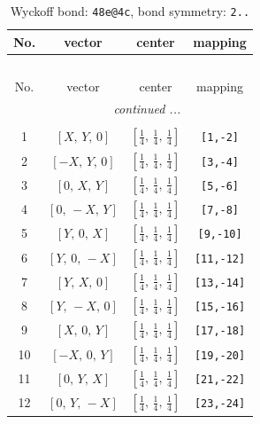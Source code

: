 \documentclass[fleqn,8pt]{jsarticle}
\begin{document}
\renewcommand{\arraystretch}{1.2}
\begin{longtable}{cccc}
\caption{Wyckoff bond: {\tt 48e@4c}, bond symmetry: {\tt 2..}}
 \\
 \hline \hline
No. & vector & center & mapping \\ \hline \endfirsthead

\multicolumn{3}{l}{\tablename\ \thetable{}} \\
 \hline \hline
No. & vector & center & mapping \\ \hline \endhead

 \hline \hline
\multicolumn{3}{r}{\footnotesize\it continued ...} \\ \endfoot

 \hline \hline
\multicolumn{3}{r}{} \\ \endlastfoot

1 & $\left[ X,\, Y,\, 0 \right]$ & $\left[ \frac{1}{4},\, \frac{1}{4},\, \frac{1}{4} \right]$ & {\tt [1,-2]} \\ \hline
2 & $\left[ - X,\, Y,\, 0 \right]$ & $\left[ \frac{1}{4},\, \frac{1}{4},\, \frac{1}{4} \right]$ & {\tt [3,-4]} \\ \hline
3 & $\left[ 0,\, X,\, Y \right]$ & $\left[ \frac{1}{4},\, \frac{1}{4},\, \frac{1}{4} \right]$ & {\tt [5,-6]} \\ \hline
4 & $\left[ 0,\, - X,\, Y \right]$ & $\left[ \frac{1}{4},\, \frac{1}{4},\, \frac{1}{4} \right]$ & {\tt [7,-8]} \\ \hline
5 & $\left[ Y,\, 0,\, X \right]$ & $\left[ \frac{1}{4},\, \frac{1}{4},\, \frac{1}{4} \right]$ & {\tt [9,-10]} \\ \hline
6 & $\left[ Y,\, 0,\, - X \right]$ & $\left[ \frac{1}{4},\, \frac{1}{4},\, \frac{1}{4} \right]$ & {\tt [11,-12]} \\ \hline
7 & $\left[ Y,\, X,\, 0 \right]$ & $\left[ \frac{1}{4},\, \frac{1}{4},\, \frac{1}{4} \right]$ & {\tt [13,-14]} \\ \hline
8 & $\left[ Y,\, - X,\, 0 \right]$ & $\left[ \frac{1}{4},\, \frac{1}{4},\, \frac{1}{4} \right]$ & {\tt [15,-16]} \\ \hline
9 & $\left[ X,\, 0,\, Y \right]$ & $\left[ \frac{1}{4},\, \frac{1}{4},\, \frac{1}{4} \right]$ & {\tt [17,-18]} \\ \hline
10 & $\left[ - X,\, 0,\, Y \right]$ & $\left[ \frac{1}{4},\, \frac{1}{4},\, \frac{1}{4} \right]$ & {\tt [19,-20]} \\ \hline
11 & $\left[ 0,\, Y,\, X \right]$ & $\left[ \frac{1}{4},\, \frac{1}{4},\, \frac{1}{4} \right]$ & {\tt [21,-22]} \\ \hline
12 & $\left[ 0,\, Y,\, - X \right]$ & $\left[ \frac{1}{4},\, \frac{1}{4},\, \frac{1}{4} \right]$ & {\tt [23,-24]} \\
\end{longtable}
\end{document}
